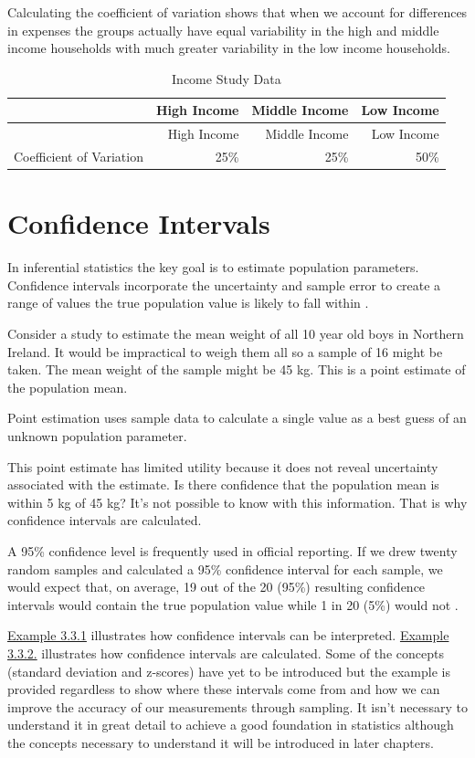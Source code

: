 \documentclass[
]{book}
\begin{document}
Calculating the coefficient of variation shows that when we account for differences in expenses the groups actually have equal variability in the high and middle income households with much greater variability in the low income households.

\begin{longtable}[]{@{}rrrr@{}}
\caption{\label{tab:table00000} Income Study Data}\tabularnewline
\toprule
& High Income & Middle Income & Low Income \\
\midrule
\endfirsthead
\toprule
& High Income & Middle Income & Low Income \\
\midrule
\endhead
Coefficient of Variation & 25\% & 25\% & 50\% \\
\bottomrule
\end{longtable}

\hypertarget{confint}{%
\section{Confidence Intervals}\label{confint}}

In inferential statistics the key goal is to estimate population parameters. Confidence intervals incorporate the uncertainty and sample error to create a range of values the true population value is likely to fall within \citep{Frost2019}.

Consider a study to estimate the mean weight of all 10 year old boys in Northern Ireland. It would be impractical to weigh them all so a sample of 16 might be taken. The mean weight of the sample might be 45 kg. This is a point estimate of the population mean.

Point estimation uses sample data to calculate a single value as a best guess of an unknown population parameter.

This point estimate has limited utility because it does not reveal uncertainty associated with the estimate. Is there confidence that the population mean is within 5 kg of 45 kg? It's not possible to know with this information. That is why confidence intervals are calculated.

A 95\% confidence level is frequently used in official reporting. If we drew twenty random samples and calculated a 95\% confidence interval for each sample, we would expect that, on average, 19 out of the 20 (95\%) resulting confidence intervals would contain the true population value while 1 in 20 (5\%) would not \citep{uncertainty}.

\protect\hyperlink{example1}{Example 3.3.1} illustrates how confidence intervals can be interpreted. \protect\hyperlink{example2}{Example 3.3.2.} illustrates how confidence intervals are calculated. Some of the concepts (standard deviation and z-scores) have yet to be introduced but the example is provided regardless to show where these intervals come from and how we can improve the accuracy of our measurements through sampling. It isn't necessary to understand it in great detail to achieve a good foundation in statistics although the concepts necessary to understand it will be introduced in later chapters.
\end{document}
